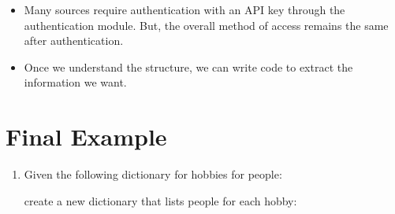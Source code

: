 \documentclass[letterpaper,10pt,english]{sphinxmanual}
\begin{document}
\begin{itemize}
\begin{itemize}
\end{itemize}

\item {} 
Many sources require authentication with an API key through the
 authentication module. But, the overall method of access
remains the same after authentication.

\item {} 
Once we understand the structure, we can write code to extract the
information we want.

\end{itemize}


\section{Final Example}
\label{\detokenize{lecture_notes/lec17_dictionaries2:final-example}}\begin{enumerate}
\def\theenumi{\arabic{enumi}}
\def\labelenumi{\theenumi .}
\makeatletter\def\p@enumii{\p@enumi \theenumi .}\makeatother
\item {} 
Given the following dictionary for hobbies for people:

\begin{sphinxVerbatim}[commandchars=\\\{\}]
  \PYG{p}{[}\PYG{p}{]} \PYG{p}{[}\PYG{p}{]}
\end{sphinxVerbatim}

create a new dictionary that lists people for each hobby:

\begin{sphinxVerbatim}[commandchars=\\\{\}]
   
\end{sphinxVerbatim}

\end{enumerate}
\end{document}
